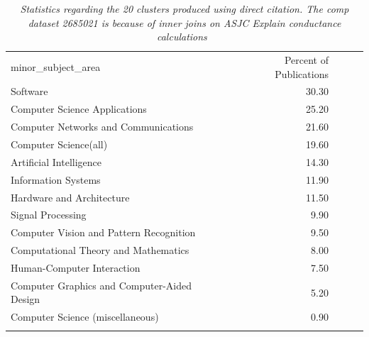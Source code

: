 \begin{table}[ht]
\caption{\emph{Statistics regarding the 20 clusters produced using direct citation. The \emph{comp} dataset 
2685021 is because of inner joins on ASJC Explain conductance calculations~\cite{shun_parallel_2016}}}
\label{tab:1}       
\begin{tabular}{lrccc}
\hline\noalign{\smallskip}
minor\_subject\_area & Percent of Publications \\
\noalign{\smallskip}\hline\noalign{\smallskip}
Software & 30.30 \\ 
Computer Science Applications & 25.20 \\ 
Computer Networks and Communications & 21.60 \\ 
Computer Science(all) & 19.60 \\ 
Artificial Intelligence & 14.30 \\ 
Information Systems & 11.90 \\ 
Hardware and Architecture & 11.50 \\ 
Signal Processing & 9.90 \\ 
Computer Vision and Pattern Recognition & 9.50 \\ 
Computational Theory and Mathematics & 8.00 \\ 
Human-Computer Interaction & 7.50 \\ 
Computer Graphics and Computer-Aided Design & 5.20 \\ 
Computer Science (miscellaneous) & 0.90 \\ 
\noalign{\smallskip}\hline
\end{tabular}
\end{table}
\newpage

